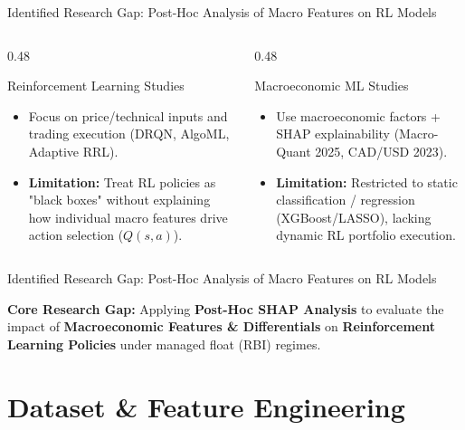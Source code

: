 \documentclass[aspectratio=169]{beamer}
\begin{document}
\begin{frame}{Identified Research Gap: Post-Hoc Analysis of Macro Features on RL Models}

	\begin{columns}[T]
		\begin{column}{0.48\textwidth}
			\begin{block}{Reinforcement Learning Studies}
				\begin{itemize}
					\item Focus on price/technical inputs and trading execution (DRQN, AlgoML, Adaptive RRL).
					\item \textbf{Limitation:} Treat RL policies as "black boxes" without explaining how individual macro features drive action selection ($Q(s,a)$).
				\end{itemize}
			\end{block}
		\end{column}
		\begin{column}{0.48\textwidth}
			\begin{block}{Macroeconomic ML Studies}
				\begin{itemize}
					\item Use macroeconomic factors + SHAP explainability (Macro-Quant 2025, CAD/USD 2023).
					\item \textbf{Limitation:} Restricted to static classification / regression (XGBoost/LASSO), lacking dynamic RL portfolio execution.
				\end{itemize}
			\end{block}
		\end{column}
	\end{columns}

\end{frame}

\begin{frame}{Identified Research Gap: Post-Hoc Analysis of Macro Features on RL Models}

	\begin{center}
		\small \textbf{Core Research Gap:} Applying \textbf{Post-Hoc SHAP Analysis} to evaluate the impact of \textbf{Macroeconomic Features \& Differentials} on \textbf{Reinforcement Learning Policies} under managed float (RBI) regimes.
	\end{center}
\end{frame}

\section{Dataset \& Feature Engineering}
\end{document}

